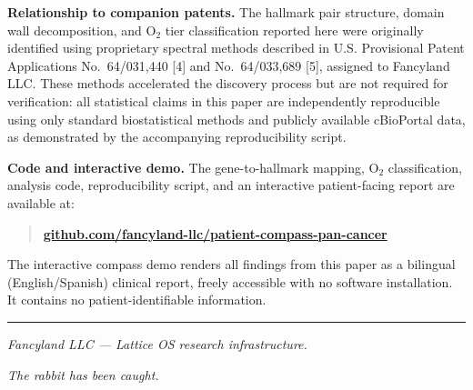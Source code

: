 \documentclass[
  11pt,
]{article}
\begin{document}
\textbf{Relationship to companion patents.} The hallmark pair structure,
domain wall decomposition, and O\(_2\) tier classification reported here
were originally identified using proprietary spectral methods described
in U.S. Provisional Patent Applications No.~64/031,440 {[}4{]} and
No.~64/033,689 {[}5{]}, assigned to Fancyland LLC. These methods
accelerated the discovery process but are not required for verification:
all statistical claims in this paper are independently reproducible
using only standard biostatistical methods and publicly available
cBioPortal data, as demonstrated by the accompanying reproducibility
script.

\textbf{Code and interactive demo.} The gene-to-hallmark mapping,
O\(_2\) classification, analysis code, reproducibility script, and an
interactive patient-facing report are available at:

\begin{quote}
\textbf{\href{https://github.com/fancyland-llc/patient-compass-pan-cancer}{github.com/fancyland-llc/patient-compass-pan-cancer}}
\end{quote}

The interactive compass demo renders all findings from this paper as a
bilingual (English/Spanish) clinical report, freely accessible with no
software installation. It contains no patient-identifiable information.

\vspace{3em}
\begin{center}
\rule{0.4\textwidth}{0.5pt}

\vspace{0.8em}

\textit{Fancyland LLC --- Lattice OS research infrastructure.}

\vspace{0.3em}

\textit{The rabbit has been caught.}
\end{center}
\end{document}

